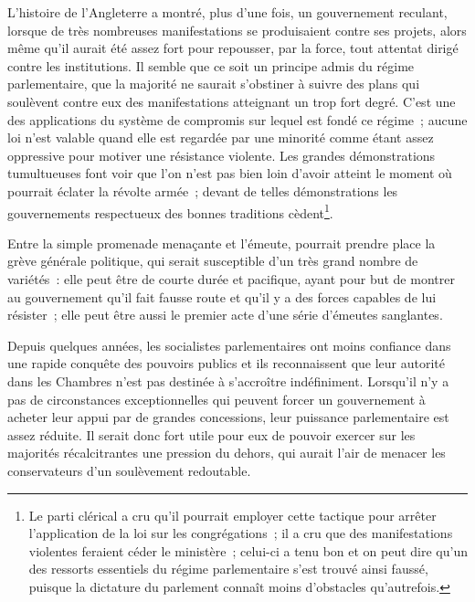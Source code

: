 \documentclass[french,twoside]{book} %
\begin{document}
L’histoire de l’Angleterre a montré, plus d’une fois, un gouvernement reculant, lorsque de très nombreuses manifestations se produisaient contre ses projets, alors même qu’il aurait été assez fort pour repousser, par la force, tout attentat dirigé contre les institutions. Il semble que ce soit un principe admis du régime parlementaire, que la majorité ne saurait s’obstiner à suivre des plans qui soulèvent contre eux des manifestations atteignant un trop fort degré. C’est une des applications du système de compromis sur lequel est fondé ce régime ; aucune loi n’est valable quand elle est regardée par une minorité comme étant assez oppressive pour motiver une résistance violente. Les grandes démonstrations tumultueuses font voir que l’on n’est pas bien loin d’avoir atteint le moment où pourrait éclater la révolte armée ; devant de telles démonstrations les gouvernements respectueux des bonnes traditions cèdent\footnote{ \noindent Le parti clérical a cru qu’il pourrait employer cette tactique pour arrêter l’application de la loi sur les congrégations ; il a cru que des manifestations violentes feraient céder le ministère ; celui-ci a tenu bon et on peut dire qu’un des ressorts essentiels du régime parlementaire s’est trouvé ainsi faussé, puisque la dictature du parlement connaît moins d’obstacles qu’autrefois.
 }.\par
 Entre la simple promenade menaçante et l’émeute, pourrait prendre place la grève générale politique, qui serait susceptible d’un très grand nombre de variétés : elle peut être de courte durée et pacifique, ayant pour but de montrer au gouvernement qu’il fait fausse route et qu’il y a des forces capables de lui résister ; elle peut être aussi le premier acte d’une série d’émeutes sanglantes.\par
Depuis quelques années, les socialistes parlementaires ont moins confiance dans une rapide conquête des pouvoirs publics et ils reconnaissent que leur autorité dans les Chambres n’est pas destinée à s’accroître indéfiniment. Lorsqu’il n’y a pas de circonstances exceptionnelles qui peuvent forcer un gouvernement à acheter leur appui par de grandes concessions, leur puissance parlementaire est assez réduite. Il serait donc fort utile pour eux de pouvoir exercer sur les majorités récalcitrantes une pression du dehors, qui aurait l’air de menacer les conservateurs d’un soulèvement redoutable.\par
\end{document}

